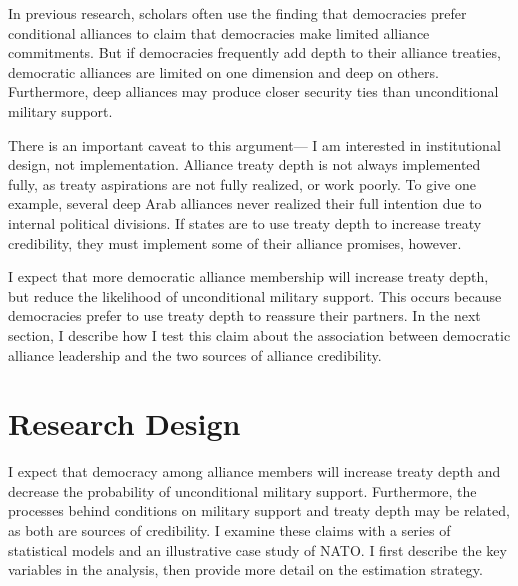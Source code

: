 \documentclass[12pt]{article}
\begin{document}
In previous research, scholars often use the finding that democracies prefer conditional alliances to claim that democracies make limited alliance commitments. 
But if democracies frequently add depth to their alliance treaties, democratic alliances are limited on one dimension and deep on others. 
Furthermore, deep alliances may produce closer security ties than unconditional military support.  


There is an important caveat to this argument--- I am interested in institutional design, not implementation.
Alliance treaty depth is not always implemented fully, as treaty aspirations are not fully realized, or work poorly. 
To give one example, several deep Arab alliances never realized their full intention due to internal political divisions.  
If states are to use treaty depth to increase treaty credibility, they must implement some of their alliance promises, however. 


I expect that more democratic alliance membership will increase treaty depth, but reduce the likelihood of unconditional military support.  
This occurs because democracies prefer to use treaty depth to reassure their partners. 
In the next section, I describe how I test this claim about the association between democratic alliance leadership and the two sources of alliance credibility. 



\section{Research Design}

 
I expect that democracy among alliance members will increase treaty depth and decrease the probability of unconditional military support. 
Furthermore, the processes behind conditions on military support and treaty depth may be related, as both are sources of credibility. 
I examine these claims with a series of statistical models and an illustrative case study of NATO. 
I first describe the key variables in the analysis, then provide more detail on the estimation strategy. 
\end{document}
